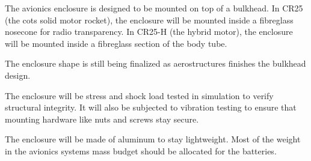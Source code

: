 The avionics enclosure is designed to be mounted on top of a bulkhead. In CR25 (the \gls{cots} solid motor rocket), the
enclosure will be mounted inside a fibreglass nosecone for radio transparency. In CR25-H (the hybrid motor), the
enclosure will be mounted inside a fibreglass section of the body tube.

The enclosure shape is still being finalized as aerostructures finishes the bulkhead design.

The enclosure will be stress and shock load tested in simulation to verify structural integrity. It will also be
subjected to vibration testing to ensure that mounting hardware like nuts and screws stay secure.

The enclosure will be made of aluminum to stay lightweight. Most of the weight in the avionics systems mass budget
should be allocated for the batteries.
